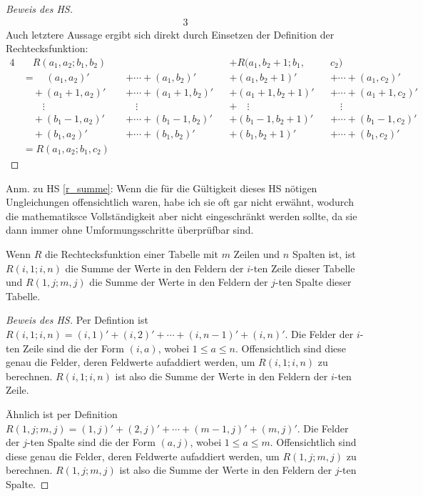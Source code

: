 \begin{proof}[Beweis des HS]
\begin{alignat*}{3}
    \end{alignat*}
    Auch letztere Aussage ergibt sich direkt durch Einsetzen der Definition der Rechtecksfunktion:
    \begin{alignat*}{4}
        &\quad R(a_1, a_2; b_1, b_2)&& &&+R(a_1, b_2+1; b_1, &&c_2)\\
        &=\quad(a_1, a_2)' &&+\cdots+ (a_1, b_2)'
        &&+(a_1, b_2+1)'&&+\cdots+(a_1, c_2)'\\
        &\quad+(a_1+1, a_2)'&&+\cdots+ (a_1+1, b_2)'
        &&+(a_1+1, b_2+1)'&&+\cdots+(a_1+1, c_2)'\\
        &\quad\quad\vdots&&\quad\vdots&&+\quad\vdots&&\quad\vdots\\
        &\quad+(b_1-1, a_2)'&&+\cdots + (b_1-1, b_2)'
        &&+(b_1-1, b_2+1)'&&+\cdots+(b_1-1, c_2)'\\
        &\quad+(b_1, a_2)'&&+ \cdots + (b_1, b_2)'
        &&+(b_1, b_2+1)'&&+\cdots+(b_1, c_2)'\\
        &=R(a_1, a_2; b_1, c_2)
    \end{alignat*}
\end{proof}
Anm.  zu HS \ref{r_summe}: Wenn die für die Gültigkeit dieses HS nötigen Ungleichungen offensichtlich waren, habe 
ich sie oft gar nicht erwähnt, wodurch die mathematiksce Vollständigkeit aber nicht eingeschränkt werden sollte, 
da sie dann immer ohne Umformungsschritte überprüfbar sind.
\begin{lem}\label{r_zeile_spalte}
    Wenn $R$ die Rechtecksfunktion einer Tabelle mit $m$ Zeilen und $n$ Spalten ist, ist $R(i, 1; i, n)$ die Summe 
    der Werte in den Feldern der $i$-ten Zeile dieser Tabelle und $R(1, j; m, j)$ die Summe der Werte in den Feldern 
    der $j$-ten Spalte dieser Tabelle.
\end{lem}
\begin{proof}[Beweis des HS]
    Per Defintion ist $R(i, 1; i, n)=(i, 1)'+(i, 2)'+\cdots+(i, n-1)'+(i, n)'$. Die Felder der $i$-ten Zeile sind die 
    der Form $(i, a)$, wobei $1\leq a\leq n$. Offensichtlich sind diese genau die Felder, deren Feldwerte aufaddiert 
    werden, um $R(i, 1; i, n)$ zu berechnen. $R(i, 1; i, n)$ ist also die Summe der Werte in den Feldern der $i$-ten 
    Zeile.

    Ähnlich ist per Definition $R(1, j; m, j)=(1, j)'+(2, j)'+\cdots+(m-1, j)'+(m, j)'$. Die Felder der $j$-ten Spalte 
    sind die der Form $(a, j)$, wobei $1\leq a\leq m$. Offensichtlich sind diese genau die Felder, deren Feldwerte 
    aufaddiert werden, um $R(1, j; m, j)$ zu berechnen. $R(1, j; m, j)$ ist also die Summe der Werte in den Feldern 
    der $j$-ten Spalte.
\end{proof}
